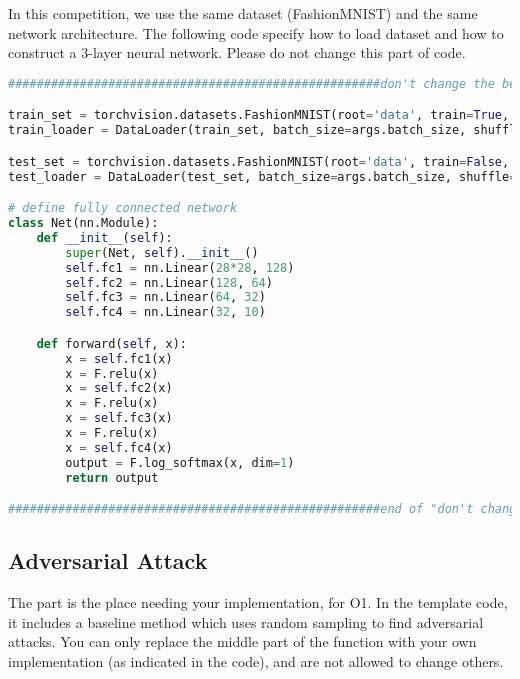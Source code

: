 In this competition, we use the same dataset (FashionMNIST) and the same network architecture. The following code specify how to load dataset and how to construct a 3-layer neural network. Please do not change this part of code. 

\begin{lstlisting}[language=Python]
####################################################don't change the below code    ####################################################

train_set = torchvision.datasets.FashionMNIST(root='data', train=True, download=True, transform=transforms.Compose([transforms.ToTensor()]))
train_loader = DataLoader(train_set, batch_size=args.batch_size, shuffle=True)

test_set = torchvision.datasets.FashionMNIST(root='data', train=False, download=True, transform=transforms.Compose([transforms.ToTensor()]))
test_loader = DataLoader(test_set, batch_size=args.batch_size, shuffle=True)

# define fully connected network
class Net(nn.Module):
    def __init__(self):
        super(Net, self).__init__()
        self.fc1 = nn.Linear(28*28, 128)
        self.fc2 = nn.Linear(128, 64)
        self.fc3 = nn.Linear(64, 32)
        self.fc4 = nn.Linear(32, 10)

    def forward(self, x):
        x = self.fc1(x)
        x = F.relu(x)
        x = self.fc2(x)
        x = F.relu(x)
        x = self.fc3(x)
        x = F.relu(x)
        x = self.fc4(x)
        output = F.log_softmax(x, dim=1)
        return output

####################################################end of "don't change the below code"   ####################################################
\end{lstlisting}


\subsection*{Adversarial Attack}

The part is the place needing your implementation, for O1. In the template code, it includes a baseline method which uses random sampling to find adversarial attacks. You can only replace the  middle part of the function with your own implementation (as indicated in the code), and are not allowed to change others. 

